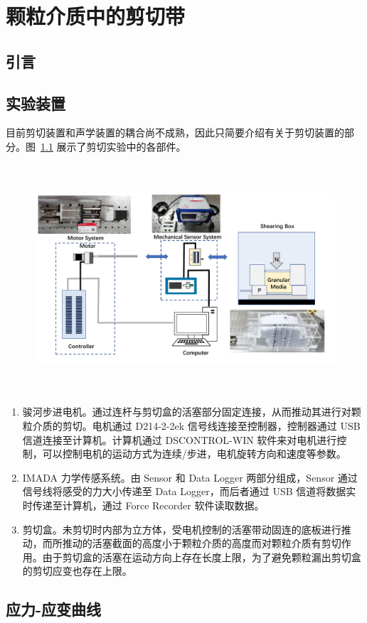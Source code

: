 
\chapter{颗粒介质中的剪切带}

\section{引言}



\section{实验装置}

目前剪切装置和声学装置的耦合尚不成熟，因此只简要介绍有关于剪切装置的部分。图~\ref{fig:apparatus_2} 展示了剪切实验中的各部件。

\begin{figure}[!htp]
    \centering
    \includegraphics[height=8.5cm]{figures/4_apparatus.pdf}
    \label{fig:apparatus_2}
  \end{figure}

\begin{enumerate}
    \item 骏河步进电机。通过连杆与剪切盒的活塞部分固定连接，从而推动其进行对颗粒介质的剪切。电机通过 D214-2-2ek 信号线连接至控制器，控制器通过 USB 信道连接至计算机。计算机通过 DSCONTROL-WIN 软件来对电机进行控制，可以控制电机的运动方式为连续/步进，电机旋转方向和速度等参数。
    \item IMADA 力学传感系统。由 Sensor 和 Data Logger 两部分组成，Sensor 通过信号线将感受的力大小传递至 Data Logger，而后者通过 USB 信道将数据实时传递至计算机，通过 Force Recorder 软件读取数据。
    \item 剪切盒。未剪切时内部为立方体，受电机控制的活塞带动固连的底板进行推动，而所推动的活塞截面的高度小于颗粒介质的高度而对颗粒介质有剪切作用。由于剪切盒的活塞在运动方向上存在长度上限，为了避免颗粒漏出剪切盒的剪切应变也存在上限。
\end{enumerate}

\section{应力-应变曲线}


